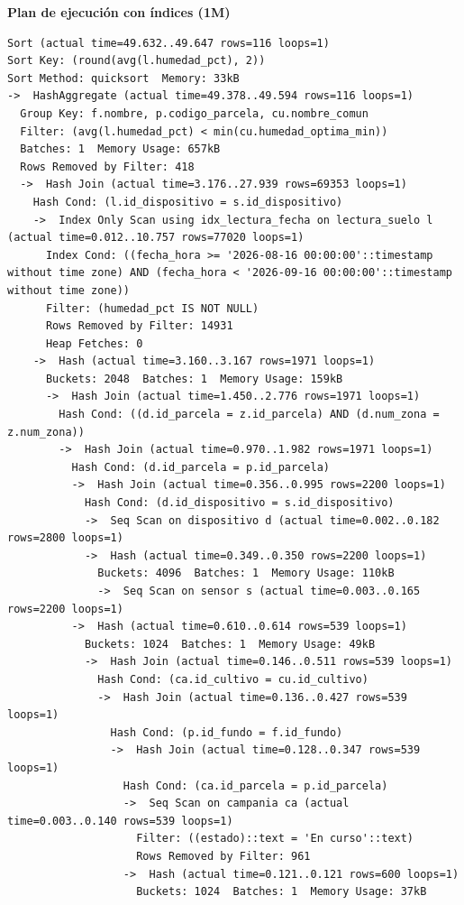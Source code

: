 \documentclass[11pt,letterpaper]{article}
\begin{document}
\textbf{Plan de ejecución con índices (1M)}
\begin{lstlisting}[style=plano]
Sort (actual time=49.632..49.647 rows=116 loops=1)
Sort Key: (round(avg(l.humedad_pct), 2))
Sort Method: quicksort  Memory: 33kB
->  HashAggregate (actual time=49.378..49.594 rows=116 loops=1)
  Group Key: f.nombre, p.codigo_parcela, cu.nombre_comun
  Filter: (avg(l.humedad_pct) < min(cu.humedad_optima_min))
  Batches: 1  Memory Usage: 657kB
  Rows Removed by Filter: 418
  ->  Hash Join (actual time=3.176..27.939 rows=69353 loops=1)
    Hash Cond: (l.id_dispositivo = s.id_dispositivo)
    ->  Index Only Scan using idx_lectura_fecha on lectura_suelo l (actual time=0.012..10.757 rows=77020 loops=1)
      Index Cond: ((fecha_hora >= '2026-08-16 00:00:00'::timestamp without time zone) AND (fecha_hora < '2026-09-16 00:00:00'::timestamp without time zone))
      Filter: (humedad_pct IS NOT NULL)
      Rows Removed by Filter: 14931
      Heap Fetches: 0
    ->  Hash (actual time=3.160..3.167 rows=1971 loops=1)
      Buckets: 2048  Batches: 1  Memory Usage: 159kB
      ->  Hash Join (actual time=1.450..2.776 rows=1971 loops=1)
        Hash Cond: ((d.id_parcela = z.id_parcela) AND (d.num_zona = z.num_zona))
        ->  Hash Join (actual time=0.970..1.982 rows=1971 loops=1)
          Hash Cond: (d.id_parcela = p.id_parcela)
          ->  Hash Join (actual time=0.356..0.995 rows=2200 loops=1)
            Hash Cond: (d.id_dispositivo = s.id_dispositivo)
            ->  Seq Scan on dispositivo d (actual time=0.002..0.182 rows=2800 loops=1)
            ->  Hash (actual time=0.349..0.350 rows=2200 loops=1)
              Buckets: 4096  Batches: 1  Memory Usage: 110kB
              ->  Seq Scan on sensor s (actual time=0.003..0.165 rows=2200 loops=1)
          ->  Hash (actual time=0.610..0.614 rows=539 loops=1)
            Buckets: 1024  Batches: 1  Memory Usage: 49kB
            ->  Hash Join (actual time=0.146..0.511 rows=539 loops=1)
              Hash Cond: (ca.id_cultivo = cu.id_cultivo)
              ->  Hash Join (actual time=0.136..0.427 rows=539 loops=1)
                Hash Cond: (p.id_fundo = f.id_fundo)
                ->  Hash Join (actual time=0.128..0.347 rows=539 loops=1)
                  Hash Cond: (ca.id_parcela = p.id_parcela)
                  ->  Seq Scan on campania ca (actual time=0.003..0.140 rows=539 loops=1)
                    Filter: ((estado)::text = 'En curso'::text)
                    Rows Removed by Filter: 961
                  ->  Hash (actual time=0.121..0.121 rows=600 loops=1)
                    Buckets: 1024  Batches: 1  Memory Usage: 37kB

\end{lstlisting}
\end{document}

